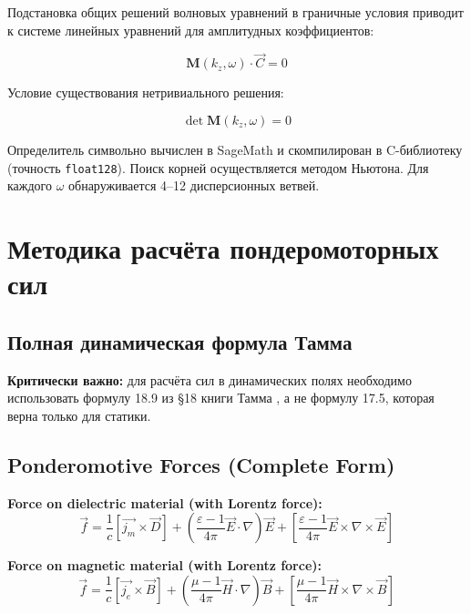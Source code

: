 \documentclass[a4paper,12pt]{article}
\begin{document}
Подстановка общих решений волновых уравнений в граничные условия приводит
к системе линейных уравнений для амплитудных коэффициентов:

\begin{equation}
\mathbf{M}(k_z, \omega) \cdot \vec{C} = 0
\label{eq:linear_system}
\end{equation}

Условие существования нетривиального решения:

\begin{equation}
\det \mathbf{M}(k_z, \omega) = 0
\label{eq:characteristic}
\end{equation}

Определитель символьно вычислен в SageMath и скомпилирован в C-библиотеку
(точность \texttt{float128}). Поиск корней осуществляется методом Ньютона.
Для каждого $\omega$ обнаруживается 4--12 дисперсионных ветвей.

\section{Методика расчёта пондеромоторных сил}

\subsection{Полная динамическая формула Тамма}

\textbf{Критически важно:} для расчёта сил в динамических полях необходимо
использовать формулу 18.9 из \S 18 книги Тамма \cite{Tamm}, а не формулу 17.5,
которая верна только для статики.


\subsection{Ponderomotive Forces (Complete Form)}
\textbf{Force on dielectric material (with Lorentz force):}
\begin{equation}
\vec{f} = \frac{1}{c} \left[\vec{j_m} \times \vec{D} \right] + \left(\frac{\varepsilon - 1}{4\pi}\vec{E} \cdot \nabla \right) \vec{E} + \left[\frac{\varepsilon - 1}{4\pi}\vec{E} \times \nabla \times \vec{E}\right]
\end{equation}

\textbf{Force on magnetic material (with Lorentz force):}
\begin{equation}
\vec{f} = \frac{1}{c} \left[\vec{j_e} \times \vec{B} \right] + \left(\frac{\mu - 1}{4\pi}\vec{H} \cdot \nabla \right) \vec{B} + \left[\frac{\mu - 1}{4\pi}\vec{H} \times \nabla \times \vec{B}\right]
\end{equation}
\end{document}
